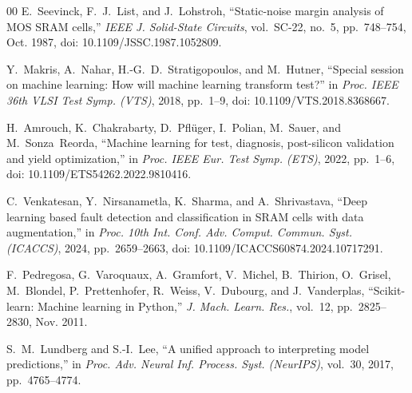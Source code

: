 \documentclass[conference]{IEEEtran}
\begin{document}
\begin{thebibliography}{00}
E.~Seevinck, F.~J.~List, and J.~Lohstroh, ``Static-noise margin analysis of MOS SRAM cells,'' \emph{IEEE J. Solid-State Circuits}, vol.~SC-22, no.~5, pp.~748--754, Oct. 1987, doi: 10.1109/JSSC.1987.1052809.

Y.~Makris, A.~Nahar, H.-G.~D.~Stratigopoulos, and M.~Hutner, ``Special session on machine learning: How will machine learning transform test?'' in \emph{Proc. IEEE 36th VLSI Test Symp. (VTS)}, 2018, pp.~1--9, doi: 10.1109/VTS.2018.8368667.

H.~Amrouch, K.~Chakrabarty, D.~Pfl\"uger, I.~Polian, M.~Sauer, and M.~Sonza~Reorda, ``Machine learning for test, diagnosis, post-silicon validation and yield optimization,'' in \emph{Proc. IEEE Eur. Test Symp. (ETS)}, 2022, pp.~1--6, doi: 10.1109/ETS54262.2022.9810416.

C.~Venkatesan, Y.~Nirsanametla, K.~Sharma, and A.~Shrivastava, ``Deep learning based fault detection and classification in SRAM cells with data augmentation,'' in \emph{Proc. 10th Int. Conf. Adv. Comput. Commun. Syst. (ICACCS)}, 2024, pp.~2659--2663, doi: 10.1109/ICACCS60874.2024.10717291.

F.~Pedregosa, G.~Varoquaux, A.~Gramfort, V.~Michel, B.~Thirion, O.~Grisel, M.~Blondel, P.~Prettenhofer, R.~Weiss, V.~Dubourg, and J.~Vanderplas, ``Scikit-learn: Machine learning in Python,'' \emph{J. Mach. Learn. Res.}, vol.~12, pp.~2825--2830, Nov. 2011.

S.~M.~Lundberg and S.-I.~Lee, ``A unified approach to interpreting model predictions,'' in \emph{Proc. Adv. Neural Inf. Process. Syst. (NeurIPS)}, vol.~30, 2017, pp.~4765--4774.

\end{thebibliography}
\end{document}
